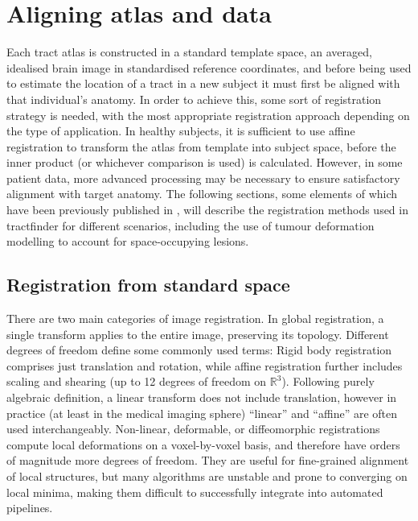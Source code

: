 \chapter{Aligning atlas and data}
\label{chap:reg}

Each tract atlas is constructed in a standard template space, an averaged, idealised brain image in standardised reference coordinates, and before being used to estimate the location of a tract in a new subject it must first be aligned with that individual's anatomy.
In order to achieve this, some sort of registration strategy is needed, with the most appropriate registration approach depending on the type of application.
In healthy subjects, it is sufficient to use affine registration to transform the atlas from template into subject space, before the inner product (or whichever comparison is used) is calculated.
However, in some patient data, more advanced processing may be necessary to ensure satisfactory alignment with target anatomy.
The following sections, some elements of which have been previously published in \textcite{Young2022}, will describe the registration methods used in tractfinder for different scenarios, including the use of tumour deformation modelling to account for space-occupying lesions.

\section{Registration from standard space}
\label{sec:reg1}

There are two main categories of image registration.
In global registration, a single transform applies to the entire image, preserving its topology.
Different degrees of freedom define some commonly used terms:
Rigid body registration comprises just translation and rotation, while affine registration further includes scaling and shearing (up to 12 degrees of freedom on $\mathbb{R}^3$).
Following purely algebraic definition, a linear transform does not include translation, however in practice (at least in the medical imaging sphere) ``linear'' and ``affine'' are often used interchangeably.
Non-linear, deformable, or diffeomorphic registrations compute local deformations on a voxel-by-voxel basis, and therefore have orders of magnitude more degrees of freedom.
They are useful for fine-grained alignment of local structures, but many algorithms are unstable and prone to converging on local minima, making them difficult to successfully integrate into automated pipelines.


